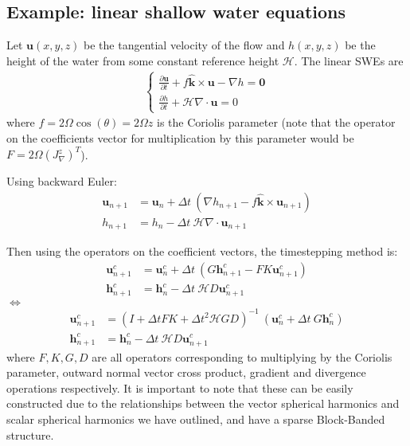 \documentclass[11pt, oneside]{article}   	%
\newcommand{\bstodo}{\todo[color=pink]}
\newcommand{\unitvec}{\hat{\bm{k}}}
\begin{document}
\subsection{Example: linear shallow water equations}
Let $\mathbf{u}(x,y,z)$ be the tangential velocity of the flow and $h(x,y,z)$ be the height of the water from some constant reference height $\mathcal{H}$. The linear SWEs are
\begin{align}
\begin{cases}
\frac{\partial \mathbf{u}}{\partial t} + f \unitvec \times \mathbf{u} - \nabla h = \mathbf{0} \\
\frac{\partial h}{\partial t} + \mathcal{H} \nabla \cdot \mathbf{u} = 0
\end{cases}
\end{align}
where $f = 2 \Omega \cos(\theta) =  2 \Omega z$ is the Coriolis parameter (note that the operator on the coefficients vector for multiplication by this parameter would be $F = 2 \Omega (J^z_\nabla)^T$).

Using backward Euler:
\begin{align}
\mathbf{u}_{n+1} &= \mathbf{u}_{n} + \Delta t \: (\nabla h_{n+1} - f \unitvec \times \mathbf{u}_{n+1}) \\
h_{n+1} &= h_n - \Delta t \: \mathcal{H} \nabla \cdot \mathbf{u}_{n+1}
\end{align}

Then using the operators on the coefficient vectors, the timestepping method is: 
\begin{align}
\mathbf{u}^c_{n+1} &= \mathbf{u}^c_{n} + \Delta t \: (G \mathbf{h}^c_{n+1} - F K \mathbf{u}^c_{n+1}) \\
\mathbf{h}^c_{n+1} &= \mathbf{h}^c_n - \Delta t \: \mathcal{H} D \mathbf{u}^c_{n+1}
\end{align}
$\iff$
\begin{align}
\mathbf{u}^c_{n+1} &= (I + \Delta t F K + \Delta t^2 \mathcal{H} G D)^{-1} \: (\mathbf{u}^c_{n} + \Delta t \: G \mathbf{h}^c_n) \\
\mathbf{h}^c_{n+1} &= \mathbf{h}^c_n - \Delta t \: \mathcal{H} D \mathbf{u}^c_{n+1}
\end{align}
where $F, K, G, D$ are all operators corresponding to multiplying by the Coriolis parameter, outward normal vector cross product, gradient and divergence operations respectively. It is important to note that these can be easily constructed due to the relationships between the vector spherical harmonics and scalar spherical harmonics we have outlined, and have \bstodo{Banded-Block-Banded?} a sparse Block-Banded structure.
\end{document}
